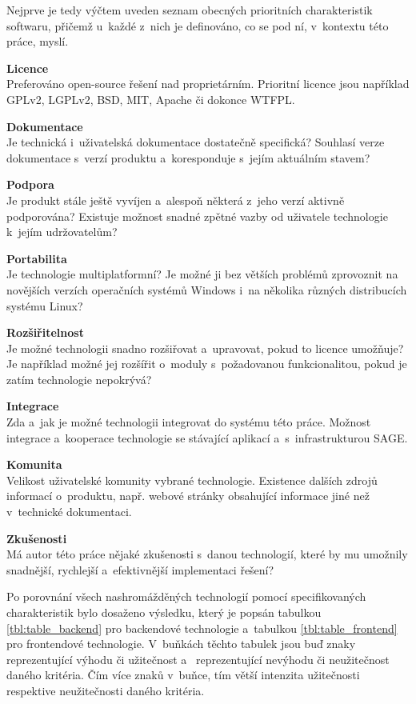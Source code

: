 \documentclass[thesis=M,czech]{FITthesis}[2012/06/26]
\begin{document}
	Nejprve je tedy výčtem uveden seznam obecných prioritních charakteristik softwaru, přičemž u~každé z~nich je definováno, co se pod ní, v~kontextu této práce, myslí.

\begin{description}
\item \textbf{Licence\\}
Preferováno open-source řešení nad proprietárním. Prioritní licence jsou například GPLv2, LGPLv2, BSD, MIT, Apache či dokonce WTFPL.
\item \textbf{Dokumentace\\}
Je technická i~uživatelská dokumentace dostatečně specifická? Souhlasí verze dokumentace s~verzí produktu a~koresponduje s~jejím aktuálním stavem?
\item \textbf{Podpora\\}
Je produkt stále ještě vyvíjen a~alespoň některá z~jeho verzí aktivně podporována? Existuje možnost snadné zpětné vazby od uživatele technologie k~jejím udržovatelům?
\item \textbf{Portabilita\\}
Je technologie multiplatformní? Je možné ji bez větších problémů zprovoznit na novějších verzích operačních systémů Windows i~na několika různých distribucích systému Linux?
\item \textbf{Rozšiřitelnost\\}
Je možné technologii snadno rozšiřovat a~upravovat, pokud to licence umožňuje? Je například možné jej rozšířit o~moduly s~požadovanou funkcionalitou, pokud je zatím technologie nepokrývá?
\item \textbf{Integrace\\}
Zda a~jak je možné technologii integrovat do systému této práce. Možnost integrace a~kooperace technologie se stávající aplikací a~s~infrastrukturou SAGE.
\item \textbf{Komunita\\}
Velikost uživatelské komunity vybrané technologie. Existence dalších zdrojů informací o~produktu, např. webové stránky obsahující informace jiné než v~technické dokumentaci.
\item \textbf{Zkušenosti\\}
Má autor této práce nějaké zkušenosti s~danou technologií, které by mu umožnily snadnější, rychlejší a~efektivnější implementaci řešení?
\end{description}

Po porovnání všech nashromážděných technologií pomocí specifikovaných charakteristik bylo dosaženo výsledku, který je popsán tabulkou \ref{tbl:table_backend} pro backendové technologie a~tabulkou \ref{tbl:table_frontend} pro frontendové technologie. V~buňkách těchto tabulek jsou buď znaky \uv{+} reprezentující výhodu či užitečnost a~\uv{--} reprezentující nevýhodu či neužitečnost daného kritéria. Čím více znaků v~buňce, tím větší intenzita užitečnosti respektive neužitečnosti daného kritéria.
\end{document}
